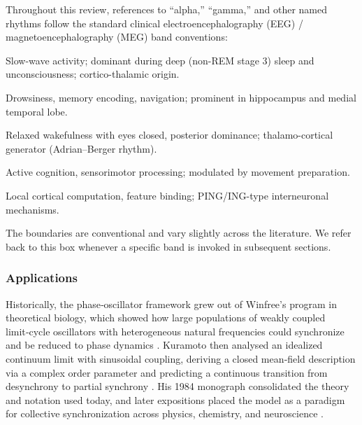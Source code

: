 \documentclass[12pt]{article}
\numberwithin{equation}{section}
\begin{document}
\begin{tcolorbox}[colback=gray!5, colframe=gray!50, title=\textbf{Box 2.1: EEG/MEG frequency bands}, fonttitle=\bfseries]
Throughout this review, references to ``alpha,'' ``gamma,'' and other named rhythms follow the standard clinical electroencephalography (EEG) / magnetoencephalography (MEG) band conventions:
\begin{description}\setlength{\itemsep}{2pt}
  \item[$\delta$ (1--4\,Hz)] Slow-wave activity; dominant during deep (non-REM stage 3) sleep and unconsciousness; cortico-thalamic origin.
  \item[$\theta$ (4--8\,Hz)] Drowsiness, memory encoding, navigation; prominent in hippocampus and medial temporal lobe.
  \item[$\alpha$ (8--13\,Hz)] Relaxed wakefulness with eyes closed, posterior dominance; thalamo-cortical generator (Adrian--Berger rhythm).
  \item[$\beta$ (13--30\,Hz)] Active cognition, sensorimotor processing; modulated by movement preparation.
  \item[$\gamma$ ($\gtrsim 30$\,Hz, often 30--80\,Hz)] Local cortical computation, feature binding; PING/ING-type interneuronal mechanisms.
\end{description}
The boundaries are conventional and vary slightly across the literature. We refer back to this box whenever a specific band is invoked in subsequent sections.
\end{tcolorbox}

\subsubsection{Applications}
Historically, the phase‑oscillator framework grew out of Winfree’s program in theoretical biology, which showed how large populations of weakly coupled limit‑cycle oscillators with heterogeneous natural frequencies could synchronize and be reduced to phase dynamics \cite{Winfree1967}. Kuramoto then analysed an idealized continuum limit with sinusoidal coupling, deriving a closed mean‑field description via a complex order parameter and predicting a continuous transition from desynchrony to partial synchrony \cite{Kuramoto1975}. His 1984 monograph consolidated the theory and notation used today, and later expositions placed the model as a paradigm for collective synchronization across physics, chemistry, and neuroscience \cite{Kuramoto1984,Strogatz2000,Acebron2005}.
\end{document}
